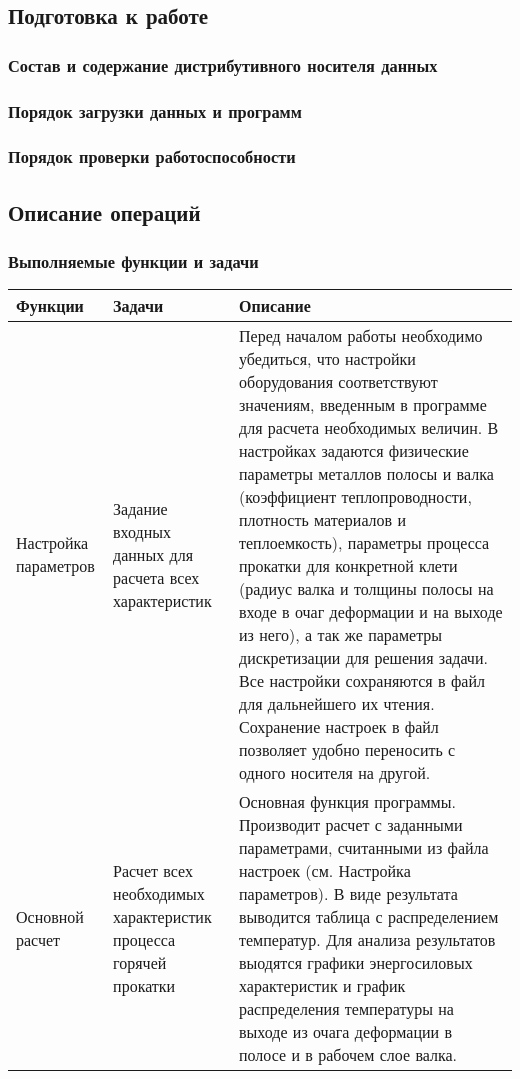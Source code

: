 \subsection{Подготовка к работе}
\subsubsection{Состав и содержание дистрибутивного носителя данных}

\subsubsection{Порядок загрузки данных и программ}
\subsubsection{Порядок проверки работоспособности}

\subsection{Описание операций}
\subsubsection{Выполняемые функции и задачи}
\begin{longtable}{|p{3cm}|p{4cm}|p{8cm}|}
\hline
Функции & Задачи & Описание\\
\hline
Настройка параметров & Задание входных данных для расчета всех характеристик & Перед началом работы необходимо убедиться, что настройки оборудования соответствуют значениям, введенным в программе для расчета необходимых величин. В настройках задаются физические параметры металлов полосы и валка (коэффициент теплопроводности, плотность материалов и теплоемкость), параметры процесса прокатки для конкретной клети (радиус валка и толщины полосы на входе в очаг деформации и на выходе из него), а так же параметры дискретизации для решения задачи. Все настройки сохраняются в файл для дальнейшего их чтения. Сохранение настроек в файл позволяет удобно переносить с одного носителя на другой.\\
\hline
Основной расчет & Расчет всех необходимых характеристик процесса горячей прокатки & Основная функция программы. Производит расчет с заданными параметрами, считанными из файла настроек (см. Настройка параметров). В виде результата выводится таблица с распределением температур. Для анализа результатов выодятся графики энергосиловых характеристик и график распределения температуры на выходе из очага деформации в полосе и в рабочем слое валка.\\
\hline
\end{longtable}

